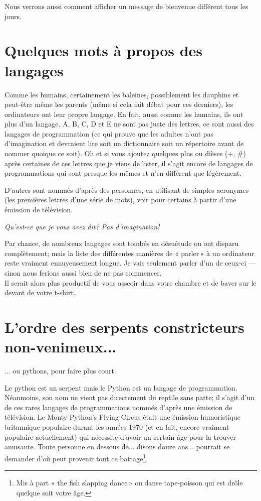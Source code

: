 Nous verrons aussi comment afficher un message de bienvenue différent tous les jours.

\section{Quelques mots à propos des langages}
Comme les humains, certainement les baleines, possiblement les dauphins et peut-être même les parents (même si cela fait débat pour ces derniers), les ordinateurs ont leur propre langage. En fait, aussi comme les humains, ils ont plus d'un langage. A, B, C, D et E ne sont pas juste des lettres, ce sont aussi des langages de programmation (ce qui prouve que les adultes n'ont pas d'imagination et devraient lire soit un dictionnaire soit un répertoire avant de nommer quoique ce soit). Oh et si vous ajoutez quelques plus ou dièses (+, \#) après certaines de ces lettres que je viens de lister, il s'agit encore de langages de programmations qui sont presque les mêmes et n'en diffèrent que légèrement.

D'autres sont nommés d'après des personnes, en utilisant de simples acronymes (les premières lettres d'une série de mots), voir pour certains à partir d'une émission de télévision. 

\bigskip
\emph{Qu'est-ce que je vous avez dit? Pas d'imagination!}

\bigskip
Par chance, de nombreux langages sont tombés en désuétude ou ont disparu complètement; mais la liste des différentes manières de « parler » à un ordinateur reste vraiment ennuyeusement longue. Je vais seulement parler d'un de ceux-ci --- sinon nous ferions aussi bien de ne pas commencer.\\


Il serait alors plus productif de vous asseoir dans votre chambre et de baver sur le devant de votre t-shirt.

\section{L'ordre des serpents constricteurs non-venimeux...}
... ou pythons, pour faire plus court.

\bigskip
Le python est un serpent mais le Python est un langage de programmation. Néanmoins, son nom ne vient pas directement du reptile sans patte; il s'agit d'un de ces rares langages de programmations nommés d'après une émission de télévision. Le Monty Python's Flying Circus était une émission humoristique britannique populaire durant les années 1970 (et en fait, encore vraiment populaire actuellement) qui nécessite d'avoir un certain âge pour la trouver amusante. Toute personne en dessous de... disons douze ans... pourrait se demander d'où peut provenir tout ce battage\footnote{Mis à part « the fish slapping dance » ou danse tape-poisson qui est drôle quelque soit votre âge.}.


